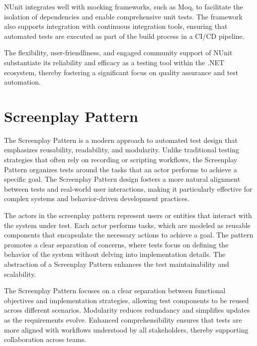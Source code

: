 NUnit integrates well with mocking frameworks, such as Moq, to facilitate the isolation of dependencies and enable comprehensive unit tests. The framework also supports integration with continuous integration tools, ensuring that automated tests are executed as part of the build process in a CI/CD pipeline.

The flexibility, user-friendliness, and engaged community support of NUnit substantiate its reliability and efficacy as a testing tool within the .NET ecosystem, thereby fostering a significant focus on quality assurance and test automation.


\section{Screenplay Pattern}\label{sub:Screenplay_pattern}

The Screenplay Pattern is a modern approach to automated test design that emphasizes reusability, readability, and modularity. Unlike traditional testing strategies that often rely on recording or scripting workflows, the Screenplay Pattern organizes tests around the tasks that an actor performs to achieve a specific goal. The Screenplay Pattern design fosters a more natural alignment between tests and real-world user interactions, making it particularly effective for complex systems and behavior-driven development practices. 

The actors in the screenplay pattern represent users or entities that interact with the system under test. Each actor performs tasks, which are modeled as reusable components that encapsulate the necessary actions to achieve a goal. The pattern promotes a clear separation of concerns, where tests focus on defining the behavior of the system without delving into implementation details. The abstraction of a Screenplay Pattern enhances the test maintainability and scalability.

The Screenplay Pattern focuses on a clear separation between functional objectives and implementation strategies, allowing test components to be reused across different scenarios. Modularity reduces redundancy and simplifies updates as the requirements evolve. Enhanced comprehensibility ensures that tests are more aligned with workflows understood by all stakeholders, thereby supporting collaboration across teams.  

